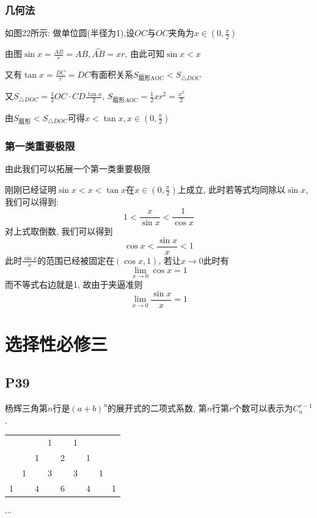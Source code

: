 \documentclass{book}
\begin{document}
    \subsection{几何法}

    如图22所示: 做单位圆(半径为1),设$OC$与$OC$夹角为$\displaystyle x\in\left( 0,\frac{\pi}{2} \right)$

    由图$\displaystyle \sin x=\frac{AB}{r}=AB,\overset{\frown }{AB}=xr$, 由此可知$\sin x<x$

    又有$\displaystyle \tan x=\frac{DC}{r}=DC$有面积关系$S_{\text{扇形AOC}}<S_{\triangle DOC}$

    又$\displaystyle S_{\triangle DOC}=\frac{1}{2}OC\cdot CD\frac{\tan x}{2}$, $\displaystyle S_{\text{扇形}AOC}=\frac{1}{2}xr^2=\frac{x^2}{2}$

    由$S_{\text{扇形}}<S_{\triangle DOC}$可得$\displaystyle x<\tan x,x\in\left( 0,\frac{\pi}{2} \right)$

    \subsection{第一类重要极限}
    由此我们可以拓展一个\textcolor[rgb]{0.38,0.11,0.2}{第一类重要极限}

    刚刚已经证明$\sin x<x<\tan x$在$\displaystyle x\in\left( 0,\frac{\pi}{2} \right)$上成立, 此时若等式均同除以$\sin x$, 我们可以得到:$$1<\frac{x}{\sin x}<\frac{1}{\cos x}$$对上式取倒数, 我们可以得到$$\cos x<\frac{\sin x}{x}<1$$此时$\displaystyle \frac{\sin x}{x}$的范围已经被固定在$\left( \cos x,1 \right)$, 若让$x\rightarrow 0$此时有$$\lim_{x \to 0} \cos x=1$$而不等式右边就是1, 故由于\textcolor[rgb]{0.75,0.17,0.22}{夹逼准则}$$\lim_{x \to 0} \frac{\sin x}{x}=1 $$

    \chapter{选择性必修三}

    \section{\textcolor[rgb]{0.11,0.65,0.52}{P39}}
    \textcolor[rgb]{0.38,0.11,0.2}{杨辉三角}第$n$行是$(a+b)^n$的展开式的二项式系数, 第$n$行第$r$个数可以表示为$C_n^{r-1}$.

    \begin{table}[htbp]
        \centering
        \begin{tabular}{lllllllll}
              &   &   & 1 &   & 1 &   &   &   \\
              &   & 1 &   & 2 &   & 1 &   &   \\
              & 1 &   & 3 &   & 3 &   & 1 &   \\
            1 &   & 4 &   & 6 &   & 4 &   & 1 \\
        \end{tabular}
    \end{table}
    \begin{center}
        $\cdots$
    \end{center}
\end{document}
